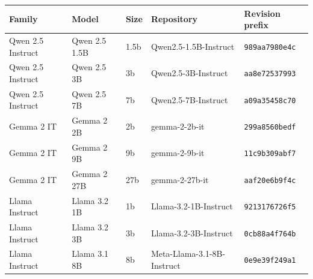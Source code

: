 \begin{tabularx}{\linewidth}{@{}lllXX@{}}
\toprule
Family & Model & Size & Repository & Revision prefix \\
\midrule
Qwen 2.5 Instruct & Qwen 2.5 1.5B & 1.5b & Qwen2.5-1.5B-Instruct & \texttt{989aa7980e4c} \\
Qwen 2.5 Instruct & Qwen 2.5 3B & 3b & Qwen2.5-3B-Instruct & \texttt{aa8e72537993} \\
Qwen 2.5 Instruct & Qwen 2.5 7B & 7b & Qwen2.5-7B-Instruct & \texttt{a09a35458c70} \\
Gemma 2 IT & Gemma 2 2B & 2b & gemma-2-2b-it & \texttt{299a8560bedf} \\
Gemma 2 IT & Gemma 2 9B & 9b & gemma-2-9b-it & \texttt{11c9b309abf7} \\
Gemma 2 IT & Gemma 2 27B & 27b & gemma-2-27b-it & \texttt{aaf20e6b9f4c} \\
Llama Instruct & Llama 3.2 1B & 1b & Llama-3.2-1B-Instruct & \texttt{9213176726f5} \\
Llama Instruct & Llama 3.2 3B & 3b & Llama-3.2-3B-Instruct & \texttt{0cb88a4f764b} \\
Llama Instruct & Llama 3.1 8B & 8b & Meta-Llama-3.1-8B-Instruct & \texttt{0e9e39f249a1} \\
\bottomrule
\end{tabularx}
